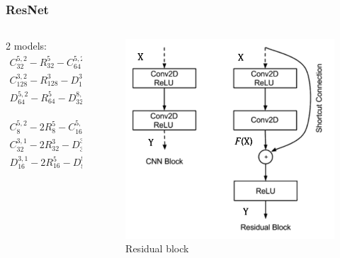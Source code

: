 \documentclass [handout] {beamer}
\begin{document}
\begin{frame}
	\frametitle{ResNet}
	\begin{columns}
		\begin{column}{0.4\textwidth}
	2 models:
	\begin{equation}
	\begin{split}
		C_{32}^{5,2} - R_{32}^5 - C_{64}^{5,2} - R_{64}^5 - \\ C_{128}^{3,2} - R_{128}^3 - D_{128}^{3,2} - R_{128}^5 -\\ D_{64}^{5,2} - R_{64}^5 - D_{32}^{8,2} - D_{3,p}^{3,1}
	\end{split}
	\label{ResNet_v1}
	\end{equation}

	\begin{equation}
	\begin{split}
		C_{8}^{5,2} - 2R_{8}^5 - C_{16}^{5,2} - 2R_{16}^5 - \\ C_{32}^{3,1} - 2R_{32}^3 - D_{32}^{3,1} - 2R_{32}^5 -\\ D_{16}^{3,1} - 2R_{16}^5 - D_{8}^{8,1} - D_{3,p}^{3,1} 
	\end{split}
	\label{ResNet_v2}
	\end{equation}
	\end{column}
	\begin{column}{0.4\textwidth}
	\begin{figure}[hbtp]
		\centering
		\includegraphics[scale=0.35]{ResidualBlock.png}
		\caption{Residual block}\label{residual_block}
	\end{figure}
	\end{column}
	\end{columns}
\end{frame}
\end{document}
